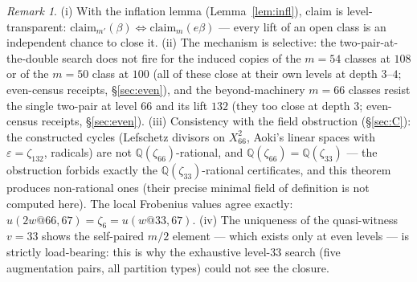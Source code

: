 \documentclass[11pt]{amsart}
\theoremstyle{remark}
\newtheorem{remark}[theorem]{Remark}
\newcommand{\Q}{\mathbb{Q}}
\newcommand{\zt}{\zeta}
\begin{document}
\begin{remark}\label{rem:App}
(i) With the inflation lemma (Lemma~\ref{lem:infl}), claim is level-transparent:
$\mathrm{claim}_{m'}(\beta)\Leftrightarrow\mathrm{claim}_m(e\beta)$ --- every lift of an open class
is an independent chance to close it. (ii) The mechanism is selective: the two-pair-at-the-double search does not fire for the induced
copies of the $m=54$ classes at $108$ or of the $m=50$ class at $100$ (all of these close at their own
levels at depth $3$--$4$; even-census receipts, \S\ref{sec:even}), and the beyond-machinery $m=66$ classes resist the
single two-pair at level $66$ and its lift $132$ (they too close at depth $3$;
even-census receipts, \S\ref{sec:even}). (iii) Consistency with
the field obstruction (\S\ref{sec:C}): the constructed cycles (Lefschetz divisors on $X^2_{66}$,
Aoki's linear spaces with $\varepsilon=\zt_{132}$, radicals) are not $\Q(\zt_{66})$-rational, and
$\Q(\zt_{66})=\Q(\zt_{33})$ --- the obstruction forbids exactly the $\Q(\zt_{33})$-rational
certificates, and this theorem produces non-rational ones (their precise minimal field of
definition is not computed here). The local Frobenius values agree exactly:
$u(2w@66,67)=\zt_6=u(w@33,67)$. (iv) The
uniqueness of the quasi-witness $v=33$ shows the self-paired $m/2$ element --- which exists only at
even levels --- is strictly load-bearing: this is why the exhaustive level-$33$ search (five
augmentation pairs, all partition types) could not see the closure.
\end{remark}
\end{document}
